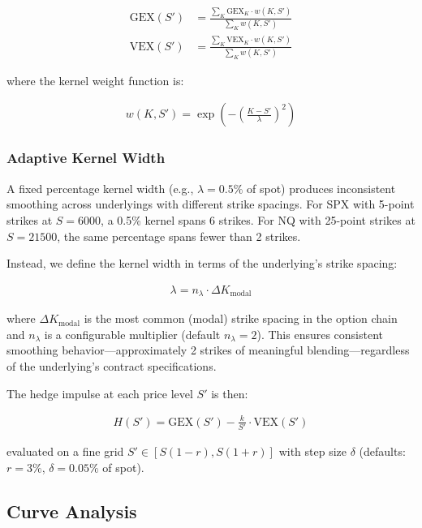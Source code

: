 \documentclass[11pt, a4paper]{article}
\begin{document}
\begin{align}
\text{GEX}(S') &= \frac{\sum_K \text{GEX}_K \cdot w(K, S')}{\sum_K w(K, S')} \\[6pt]
\text{VEX}(S') &= \frac{\sum_K \text{VEX}_K \cdot w(K, S')}{\sum_K w(K, S')}
\end{align}

where the kernel weight function is:

\begin{align}
w(K, S') = \exp\!\left(-\left(\frac{K - S'}{\lambda}\right)^2\right)
\end{align}

\subsubsection{Adaptive Kernel Width}

A fixed percentage kernel width (e.g., $\lambda = 0.5\%$ of spot) produces inconsistent smoothing across underlyings with different strike spacings. For SPX with 5-point strikes at $S = 6000$, a 0.5\% kernel spans 6 strikes. For NQ with 25-point strikes at $S = 21500$, the same percentage spans fewer than 2 strikes.

Instead, we define the kernel width in terms of the underlying's strike spacing:

\begin{align}
\lambda = n_\lambda \cdot \Delta K_{\text{modal}}
\end{align}

where $\Delta K_{\text{modal}}$ is the most common (modal) strike spacing in the option chain and $n_\lambda$ is a configurable multiplier (default $n_\lambda = 2$). This ensures consistent smoothing behavior---approximately 2 strikes of meaningful blending---regardless of the underlying's contract specifications.

The hedge impulse at each price level $S'$ is then:

\begin{align}
H(S') = \text{GEX}(S') - \frac{k}{S'} \cdot \text{VEX}(S')
\end{align}

evaluated on a fine grid $S' \in [S(1 - r), S(1 + r)]$ with step size $\delta$ (defaults: $r = 3\%$, $\delta = 0.05\%$ of spot).

\subsection{Curve Analysis}
\end{document}
